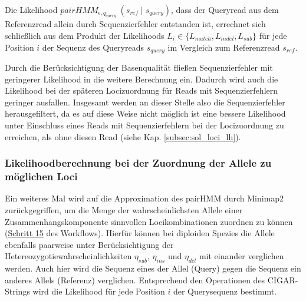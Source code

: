Die Likelihood $ pairHMM_{\epsilon, q_{query}} \;(s_{ref}\;|\; s_{query}) $, dass der Queryread aus dem Referenzread allein durch Sequenzierfehler entstanden ist, errechnet sich schließlich aus dem Produkt der Likelihoods $ L_{i} \in \{L_{match}, L_{indel}, L_{sub}\} $ für jede Position $ i $ der Sequenz des Queryreads $ s_{query} $ im Vergleich zum Referenzread $ s_{ref} $.
\vspace{-0.5cm}
\begin{center}
\end{center}
 
Durch die Berücksichtigung der Basenqualität fließen Sequenzierfehler mit geringerer Likelihood in die weitere Berechnung ein. Dadurch wird auch die Likelihood bei der späteren Locizuordnung für Reads mit Sequenzierfehlern geringer ausfallen. Insgesamt werden an dieser Stelle also die Sequenzierfehler herausgefiltert, da es auf diese Weise nicht möglich ist eine bessere Likelihood unter Einschluss eines Reads mit Sequenzierfehlern bei der Locizuordnung zu erreichen, als ohne diesen Read (siehe Kap. \ref{subsec:sol_loci_lh}).

\subsubsection{Likelihoodberechnung bei der Zuordnung der Allele zu möglichen Loci} \label{pHMM_loci}

Ein weiteres Mal wird auf die Approximation des pairHMM durch Minimap2 zurückgegriffen, um die Menge der wahrscheinlichsten Allele einer Zusammenhangskomponente sinnvollen Locikombinationen zuordnen zu können (\hyperref[step15]{Schritt 15\label{step15txt}} des Workflows). Hierfür können bei diploiden Spezies die Allele ebenfalls paarweise unter Berücksichtigung der Hetereozygotiewahrscheinlichkeiten $\eta_{sub}$, $\eta_{ins}$ und $\eta_{del}$ mit einander verglichen werden. Auch hier wird die Sequenz eines der Allel (Query) gegen die Sequenz ein anderes Allels (Referenz) verglichen. Entsprechend den Operationen des CIGAR-Strings wird die Likelihood für jede Position $i$ der Querysequenz bestimmt. \\

